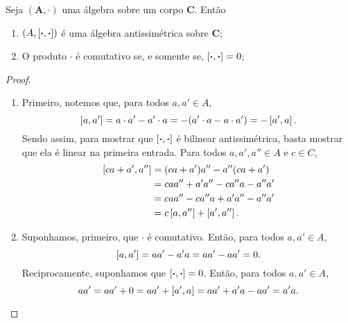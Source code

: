 \begin{proposition}
Seja $(\bm A,\cdot)$ uma álgebra sobre um corpo $\bm C$. Então
	\begin{enumerate}
	\item $(A,\left[{\bm{\cdot}},{\bm{\cdot}}\right])$ é uma álgebra antissimétrica sobre $\bm C$;
	\item O produto $\cdot$ é comutativo se, e somente se, $\left[{\bm{\cdot}},{\bm{\cdot}}\right] = 0$;
	\end{enumerate}
\end{proposition}
\begin{proof}
	\begin{enumerate}
	\item Primeiro, notemos que, para todos $a,a' \in A$,
		\begin{equation*}
		\left[{a},{a'}\right] = a \cdot a' - a' \cdot a = -(a' \cdot a - a \cdot a') = -\left[{a'},{a}\right].
		\end{equation*}	
Sendo assim, para mostrar que $\left[{\bm{\cdot}},{\bm{\cdot}}\right]$ é bilinear antissimétrica, basta mostrar que ela é linear na primeira entrada. Para todos $a,a',a'' \in A$ e $c \in C$,
		\begin{align*}
		\left[{ca+a'},{a''}\right] &= (ca+a')a'' - a''(ca+a') \\
			&= caa'' + a'a'' - ca''a - a''a' \\
			&= caa'' - ca''a + a'a'' - a''a' \\
			&= c\left[{a},{a''}\right] + \left[{a'},{a''}\right].
		\end{align*}

	\item Suponhamos, primeiro, que $\cdot$ é comutativo. Então, para todos $a,a' \in A$,
		\begin{equation*}
		\left[{a},{a'}\right] = aa' - a'a = aa' - aa' = 0.
		\end{equation*}
Reciprocamente, suponhamos que $\left[{\bm{\cdot}},{\bm{\cdot}}\right]=0$. Então, para todos $a,a' \in A$,
		\begin{equation*}
		aa' = aa' + 0 = aa' + \left[{a'},{a}\right] = aa' + a'a - aa' = a'a.
		\end{equation*}


\end{enumerate}
\end{proof}
